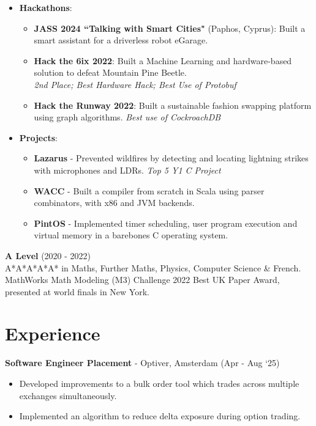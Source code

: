 \documentclass{Resume}
\begin{document}
{\begin{itemize}[label=--]
    \item \textbf{Hackathons}: \begin{itemize}
        \item \textbf{JASS 2024 ``Talking with Smart Cities"} (Paphos, Cyprus): Built a smart assistant for a driverless robot eGarage.
        \item \textbf{Hack the 6ix 2022}: Built a Machine Learning and hardware-based solution to defeat Mountain Pine Beetle. \\ \textit{2nd Place; Best Hardware Hack; Best Use of Protobuf}
        \item \textbf{Hack the Runway 2022}: Built a sustainable fashion swapping platform using graph algorithms. \textit{Best use of CockroachDB}
    \end{itemize}
    \item \textbf{Projects}:
    \begin{itemize}
        \item \textbf{Lazarus} - Prevented wildfires by detecting and locating lightning strikes with microphones and LDRs. \textit{Top 5 Y1 C Project}
        \item \textbf{WACC} - Built a compiler from scratch in Scala using parser combinators, with x86 and JVM backends.
        \item \textbf{PintOS} - Implemented timer scheduling, user program execution and virtual memory in a barebones C operating system.  
    \end{itemize}   
            
 \end{itemize}}


\textbf{A Level} \hfill (2020 - 2022) \\
{\small A*A*A*A*A* in Maths, Further Maths, Physics, Computer Science \& French. \\ 
MathWorks Math Modeling (M3) Challenge 2022 Best UK Paper Award, presented at world finals in New York}.
\vspace{-2em}
            
\section{Experience}
\textbf{Software Engineer Placement} - Optiver, Amsterdam \hfill (Apr - Aug `25)
    {\small
        \begin{itemize}[label=--]
            \item Developed improvements to a bulk order tool which trades across multiple exchanges simultaneously.
            \item Implemented an algorithm to reduce delta exposure during option trading. 
        \end{itemize}
    }
\end{document}
